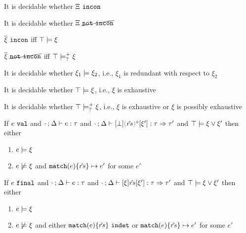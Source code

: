 \begin{lem}
  \label{lemma:inconsistency-decidability}
  It is decidable whether $\Xi ~\mathtt{incon}$
\end{lem}
\begin{lem}
  \label{lemma:not-not-inconsistency-decidability}
  It is decidable whether $\Xi ~\cancel{\mathtt{not~incon}}$
\end{lem}
\begin{lem}
  \label{lemma:inconsistent-and-entailment}
  $\overline{\xi} ~\mathtt{incon}$ iff $\top \models \xi$
\end{lem}
\begin{lem}
  \label{lemma:not-not-inconsistent-and-possible-entailment}
  $\overline{\xi} ~\cancel{\mathtt{not~incon}}$ iff $\top \models_{?}^{+} \xi$
\end{lem}
\begin{lem}
  \label{lemma:redundancy-decidability}
  It is decidable whether $\xi_1 \models \xi_2$, i.e., $\xi_1$ is redundant with respect to $\xi_2$
\end{lem}
\begin{lem}
  \label{lemma:exhaustiveness-decidability}
  It is decidable whether $\top \models \xi$, i.e., $\xi$ is exhaustive
\end{lem}
\begin{lem}
  \label{lemma:not-not-exhaustiveness-decidability}
  It is decidable whether $\top \models_{?}^{+} \xi$, i.e., $\xi$ is exhaustive or $\xi$ is possibly exhaustive
\end{lem}
\begin{lem}
  \label{lemma:val-match-progress}
  If $e ~\mathtt{val}$ and $\cdot \mathbin{;} \Delta \vdash e : \tau$ and $\czrulstyp{\cdot}{\Delta}{\cfalsity}{\rmpointer{\zrules}}{\xi'}{\tau}{\tau'}$ and $\top \models \xi \vee \xi'$
  then either
  \begin{enumerate}
    \item $e \models \xi$
    \item $e \not\models \xi$ and $\mathtt{match}(e) \{\hat{rs}\} \mapsto e'$ for some $e'$
  \end{enumerate}
\end{lem}
\begin{lem}
  \label{lemma:indet-match-progress}
  If $e ~\mathtt{final}$ and $\cdot \mathbin{;} \Delta \vdash e : \tau$ and $\cdot \mathbin{;} \Delta \vdash [\xi] \hat{rs} [\xi'] : \tau \Rightarrow \tau'$ and $\top \models \xi \vee \xi'$
  then either
  \begin{enumerate}
    \item $e \models \xi$
    \item $e \not\models \xi$ and either $\mathtt{match}(e) \{\hat{rs}\} ~\mathtt{indet}$ or $\mathtt{match}(e) \{\hat{rs}\} \mapsto e'$ for some $e'$
  \end{enumerate}
\end{lem}
